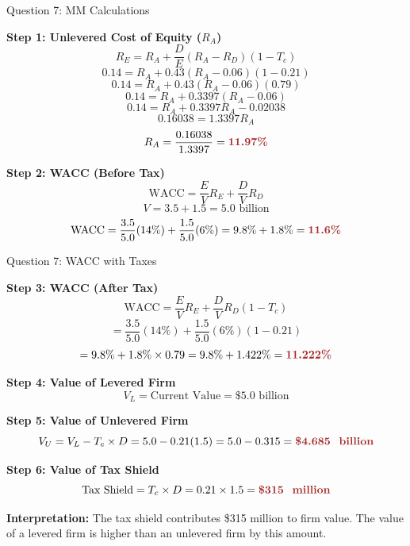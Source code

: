 \documentclass[aspectratio=169]{beamer}
\newcommand{\highlight}[1]{\textcolor{crimson}{\textbf{#1}}}
\begin{document}
	\begin{frame}{Question 7: MM Calculations}
		
		\textbf{Step 1: Unlevered Cost of Equity ($R_A$)}
		\[
		R_E = R_A + \frac{D}{E}(R_A - R_D)(1 - T_c)
		\]
		\[
		0.14 = R_A + 0.43(R_A - 0.06)(1 - 0.21)
		\]
		\[
		0.14 = R_A + 0.43(R_A - 0.06)(0.79)
		\]
		\[
		0.14 = R_A + 0.3397(R_A - 0.06)
		\]
		\[
		0.14 = R_A + 0.3397R_A - 0.02038
		\]
		\[
		0.16038 = 1.3397R_A
		\]
		\[
		R_A = \frac{0.16038}{1.3397} = \highlight{11.97\%}
		\]
		
		\textbf{Step 2: WACC (Before Tax)}
		\[
		\text{WACC} = \frac{E}{V}R_E + \frac{D}{V}R_D
		\]
		\[
		V = 3.5 + 1.5 = 5.0 \text{ billion}
		\]
		\[
		\text{WACC} = \frac{3.5}{5.0}(14\%) + \frac{1.5}{5.0}(6\%) = 9.8\% + 1.8\% = \highlight{11.6\%}
		\]
	\end{frame}
	
	\begin{frame}{Question 7: WACC with Taxes}
		
		\textbf{Step 3: WACC (After Tax)}
		\[
		\text{WACC} = \frac{E}{V}R_E + \frac{D}{V}R_D(1 - T_c)
		\]
		\[
		= \frac{3.5}{5.0}(14\%) + \frac{1.5}{5.0}(6\%)(1 - 0.21)
		\]
		\[
		= 9.8\% + 1.8\% \times 0.79 = 9.8\% + 1.422\% = \highlight{11.222\%}
		\]
		
		\textbf{Step 4: Value of Levered Firm}
		\[
		V_L = \text{Current Value} = \$5.0 \text{ billion}
		\]
		
		\textbf{Step 5: Value of Unlevered Firm}
		\[
		V_U = V_L - T_c \times D = 5.0 - 0.21(1.5) = 5.0 - 0.315 = \highlight{\$4.685 \text{ billion}}
		\]
		
		\textbf{Step 6: Value of Tax Shield}
		\[
		\text{Tax Shield} = T_c \times D = 0.21 \times 1.5 = \highlight{\$315 \text{ million}}
		\]
		
		\textbf{Interpretation:}
		The tax shield contributes \$315 million to firm value. The value of a levered firm is higher than an unlevered firm by this amount.
	\end{frame}
	
\end{document}

